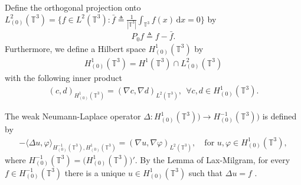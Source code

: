 \documentclass[reqno,a4paper,11pt]{amsart}
\theoremstyle{plain}
\numberwithin{equation}{section}
\begin{document}
				Define  the orthogonal projection onto $L^{2}_{(0)}(\mathbb{T}^{3})=\{f\in L^{2}(\mathbb{T}^{3}):\bar{f}\triangleq\frac{1}{|\mathbb{T}^{3}|}\int_{\mathbb{T}^{3}}f(x)\,\mathrm dx=0\}$ by
				\begin{align*}
					P_{0}f\triangleq f-\bar{f}.
				\end{align*}
				Furthermore, we define  a Hilbert space $H_{(0)}^{1}(\mathbb{T}^{3})$ by
				\begin{align*}
					H_{(0)}^{1}(\mathbb{T}^{3})=H^{1}(\mathbb{T}^{3})\cap L^{2}_{(0)}(\mathbb{T}^{3})
				\end{align*}
				with the following inner product
				\begin{align*}
					(c,d)_{H_{(0)}^{1}(\mathbb{T}^{3})}=(\nabla c,\nabla d)_{L^{2}(\mathbb{T}^{3})},\ \  \forall c,d\in H_{(0)}^{1}(\mathbb{T}^{3}).
				\end{align*}
				
				
				
				The weak Neumann-Laplace operator $\Delta:H_{(0)}^{1}(\mathbb{T}^{3}))\rightarrow H_{(0)}^{-1}(\mathbb{T}^{3}))$ is defined by
				\begin{align}
					-\langle\Delta u,\varphi\rangle_{H_{(0)}^{-1}(\mathbb{T}^{3}), H_{(0)}^{1}(\mathbb{T}^{3})}=(\nabla u,\nabla \varphi)_{L^{2}(\mathbb{T}^{3})}, \quad\text{for $u,\varphi\in H_{(0)}^{1}(\mathbb{T}^{3})$},\label{def:wnl}
				\end{align}
				where $H_{(0)}^{-1}(\mathbb{T}^{3})=\big(H_{(0)}^{1}(\mathbb{T}^{3})\big)'$.
				By the Lemma of Lax-Milgram, for every $f\in H_{(0)}^{-1}(\mathbb{T}^{3})$  there is a unique $u\in H_{(0)}^{1}(\mathbb{T}^{3})$
				such that $\Delta u=f$ .
	
\end{document}
